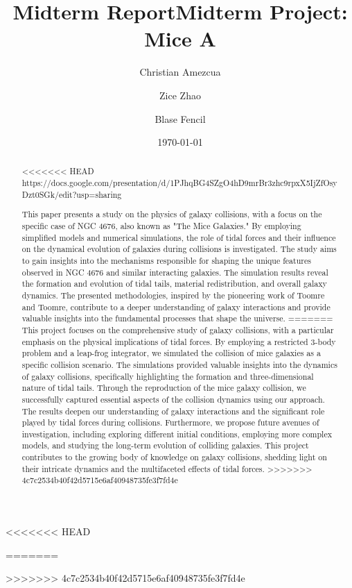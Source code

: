 \documentclass[reprint, amsmath, amssymb, aps]{revtex4-2}
\begin{document}
<<<<<<< HEAD
\title{Midterm Report}
=======
\title{Midterm Project: Mice A}
>>>>>>> 4c7c2534b40f42d5715e6af40948735fe3f7fd4e

\author{Christian Amezcua}
\author{Zice Zhao}
\author{Blase Fencil}



\date{\today}

\begin{abstract}
<<<<<<< HEAD
https://docs.google.com/presentation/d/1PJhqBG4SZgO4hD9mrBr3zhc9rpxX5IjZfOsyDzt0SGk/edit?usp=sharing

This paper presents a study on the physics of galaxy collisions, with a focus on the specific case of NGC 4676, also known as "The Mice Galaxies." By employing simplified models and numerical simulations, the role of tidal forces and their influence on the dynamical evolution of galaxies during collisions is investigated. The study aims to gain insights into the mechanisms responsible for shaping the unique features observed in NGC 4676 and similar interacting galaxies. The simulation results reveal the formation and evolution of tidal tails, material redistribution, and overall galaxy dynamics. The presented methodologies, inspired by the pioneering work of Toomre and Toomre, contribute to a deeper understanding of galaxy interactions and provide valuable insights into the fundamental processes that shape the universe.
=======
    This project focuses on the comprehensive study of galaxy collisions, with a particular emphasis on the physical implications of tidal forces. By employing a restricted 3-body problem and a leap-frog integrator, we simulated the collision of mice galaxies as a specific collision scenario. The simulations provided valuable insights into the dynamics of galaxy collisions, specifically highlighting the formation and three-dimensional nature of tidal tails. Through the reproduction of the mice galaxy collision, we successfully captured essential aspects of the collision dynamics using our approach. The results deepen our understanding of galaxy interactions and the significant role played by tidal forces during collisions. Furthermore, we propose future avenues of investigation, including exploring different initial conditions, employing more complex models, and studying the long-term evolution of colliding galaxies. This project contributes to the growing body of knowledge on galaxy collisions, shedding light on their intricate dynamics and the multifaceted effects of tidal forces.
>>>>>>> 4c7c2534b40f42d5715e6af40948735fe3f7fd4e
\end{abstract}
\end{document}
